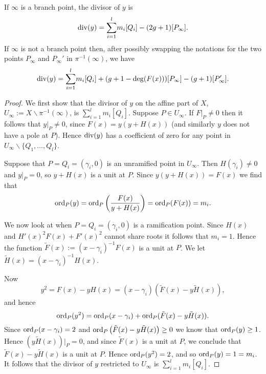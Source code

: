     \begin{prop}\label{propdivisorofypis2}
    If $\infty$ is a branch point, the divisor of $y$ is
        \begin{equation*}
        \operatorname{div}(y) = 
         {\displaystyle \sum_{i=1}^l} m_i[Q_i] -(2g+1)[P_\infty].
        \end{equation*}
    If $\infty$ is not a branch point then, after possibly swapping the notations for the two points $P_\infty$ and $P_\infty'$ in $\pi^{-1}(\infty)$, we have
        \begin{equation*}
        \operatorname{div}(y) = {\displaystyle \sum_{i=1}^l} m_i[Q_i] +(g+1-\deg(F(x)))[P_\infty] - (g+1)[P_\infty'].
        \end{equation*}
    \end{prop}
    \begin{proof}
    We first show that the divisor of $y$ on the affine part of $X$, $U_\infty := X \backslash {\pi^{-1}(\infty)}$, is $\sum_{i=1}^l m_i [Q_i]$.
    Suppose $P\in U_\infty$.
    If $\left. F \right|_P \neq 0$ then it follows that $y|_P \neq 0$, since $F(x) = y (y + H(x))$ (and similarly $y$ does not have a pole at $P$).
    Hence $\operatorname{div}(y)$ has a coefficient  of zero for any point in $U_\infty\backslash \{Q_1, \ldots, Q_l \}$.
    
    Suppose that $P= Q_i = (\gamma_i, 0)$ is an unramified point in $U_\infty$.
    Then $H(\gamma_i) \neq 0$ and $\left. y \right|_P = 0$, so $y + H(x)$ is a unit at $P$.
    Since $y(y+H(x)) = F(x)$ we find that
        \begin{equation*}
        \operatorname{ord}_P(y) = \operatorname{ord}_P\left( \frac{F(x)}{y + H(x)} \right) = \operatorname{ord}_P(F(x)) = m_i.
        \end{equation*}
    
    We now look at when $P = Q_i = (\gamma_i, 0)$ is a ramification point.
    Since $H(x)$ and $H'(x)^2F(x) + F'(x)^2$ cannot share roots it follows that $m_i = 1$.
    Hence the function $\tilde F(x) := (x- \gamma_i)^{-1}F(x)$ is a unit at $P$.
    We let $\tilde H(x) = (x- \gamma_i)^{-1}H(x)$.
    
    
    Now 
        \[
        y^2 = F(x) - y H(x) = (x- \gamma_i) \left(\tilde F(x) - y \tilde H(x)\right),
        \]
    and hence
        \[
        \operatorname{ord}_P(y^2 ) = \operatorname{ord}_P(x-\gamma_i) + \operatorname{ord}_P(\tilde F(x) - y \tilde H(x)).
        \]
    Since $\operatorname{ord}_P(x-\gamma_i) = 2$ and $\operatorname{ord}_P\left(\tilde F(x) - y \tilde H(x)\right) \geq 0$ we know that $\operatorname{ord}_P(y) \geq 1$.
    Hence $(y \tilde H(x)) \big|_P = 0$, and since $\tilde F(x)$ is a unit at $P$, we conclude that $\tilde F(x) - y \tilde H(x)$ is a unit at $P$.
    Hence $\operatorname{ord}_P(y^2) = 2$, and so $\operatorname{ord}_P(y) = 1 = m_i$.
    It follows that the divisor of $y$ restricted to $U_\infty$ is $\sum_{i=1}^l m_i [Q_i]$.
    

\end{proof}

